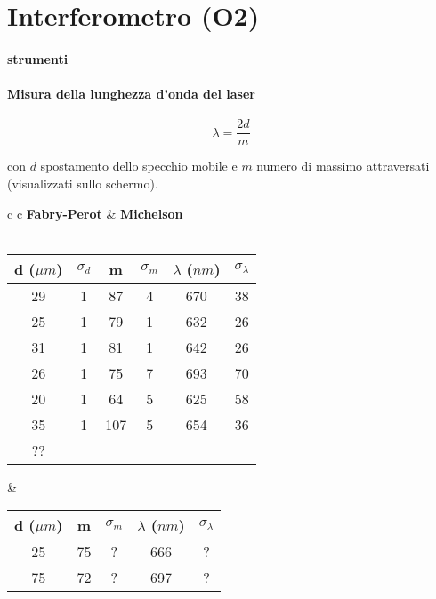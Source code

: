 
\chapter{Interferometro (O2)}

\subsubsection{ strumenti}


\subsubsection{Misura della lunghezza d'onda del laser}

$$ \lambda = \frac{2d}{m} $$

con $d$ spostamento dello specchio mobile e $m$ numero di massimo attraversati (visualizzati sullo schermo).

\begin{center}

\begin{tabular}{c c}
\textbf{Fabry-Perot} & \hspace{2cm} \textbf{Michelson}\\
\\
\begin{tabular}{c|c|c|c|c|c}
d ($\mu m$)& $\sigma_d$ & m & $\sigma_m$ & $\lambda$ ($nm$) & $\sigma_{\lambda}$\\
\midrule
29 & 1 & 87 & 4 & 670 & 38\\
25 & 1 & 79 & 1 & 632 & 26\\
31 & 1 & 81 & 1 & 642 & 26\\
26 & 1 & 75 & 7 & 693 & 70\\
20 & 1 & 64 & 5 & 625 & 58\\
35 & 1 & 107 & 5 & 654 & 36\\


?? \\

\end{tabular}

& \hspace{2cm}

\begin{tabular}{c|c|c|c|c}
d ($\mu m$)& m & $\sigma_m$ & $\lambda$ ($nm$) & $\sigma_{\lambda}$\\
\midrule
25 & 75 & ? & 666 & ?\\
75 & 72 & ? & 697 & ?\\

\end{tabular}

\end{tabular}

\end{center} 

